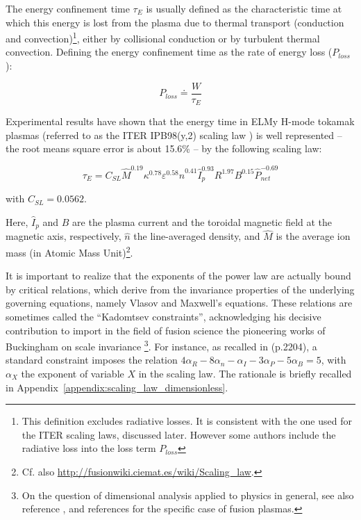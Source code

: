 The energy confinement time $\tau_E$ is usually defined as the characteristic time at which this energy is lost from the plasma due to thermal transport (conduction and convection)\footnote{This definition excludes radiative losses. It is consistent with the one used for the ITER scaling laws, discussed later. However some authors include the radiative loss into the loss term $P_{loss}$}, either by collisional conduction or by turbulent thermal convection. Defining the energy confinement time as the rate of energy loss ($P_{loss}$)\cite[p.9]{Wesson2004}:

\begin{equation}
	P_{loss} \doteq \frac{ W }{ \tau_E } 
	\label{eq:definition_confinement_time}
\end{equation}

Experimental results have shown that the energy time in ELMy H-mode tokamak plasmas (referred to as the ITER IPB98(y,2) scaling law \cite[eq.(20)]{ITERphysics_chap2}) is well represented -- the root means square error is about 15.6\% -- by the following scaling law:

\begin{equation}
	\tau_E = C_{SL} \hat M^{0.19} \kappa^{0.78} \varepsilon^{0.58} 
	\hat n^{0.41} \hat I_p^{0.93} R^{1.97} B^{0.15}  \hat P_{net}^{-0.69}
	\label{eq:scaling_law_IPB98(y,2)}
\end{equation}

\noindent
with $C_{SL} = 0.0562$.


Here, $\hat I_p$ and $B$ are the plasma current and the toroidal magnetic field at the magnetic axis, respectively, $\hat n$ the line-averaged density, and $\hat M$ is the average ion mass (in Atomic Mass Unit)\footnote{Cf. also \url{http://fusionwiki.ciemat.es/wiki/Scaling_law}.}. 


It is important to realize that the exponents of the power law are actually bound by critical relations, which derive from the invariance properties of the underlying governing equations, namely Vlasov and Maxwell's equations. These relations are sometimes called the ``Kadomtsev constraints'', acknowledging his decisive contribution \cite{Kadomtsev1975} to import in the field of fusion science the pioneering works of Buckingham on scale invariance \cite{Buckingham1914}\footnote{On the question of dimensional analysis applied to physics in general, see also reference \cite{Misic2010}, and references \cite{Connor1977, Luce2008} for the specific case of fusion plasmas.}. For instance, as recalled in \cite{ITERphysics_chap2} (p.2204), a standard constraint imposes the relation 
$4\alpha_R - 8\alpha_n - \alpha_I - 3\alpha_P - 5\alpha_B = 5$, with $\alpha_X$ the exponent of variable $X$ in the scaling law. The rationale is briefly recalled in Appendix~\ref{appendix:scaling_law_dimensionless}.




